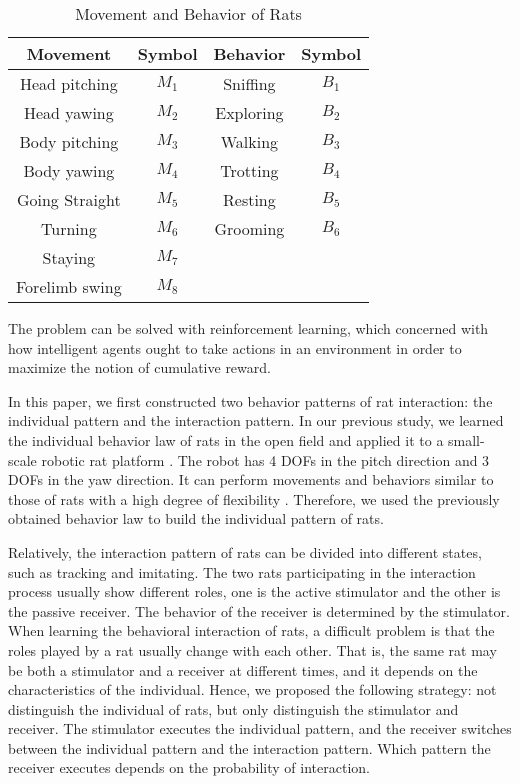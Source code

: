 \begin{table}[b]
    \caption{Movement and Behavior of Rats}
    \centering
    \begin{tabular}{cccc}
            \hline
            Movement & Symbol & Behavior & Symbol \\
            \hline
            Head pitching & $M_1$ & Sniffing & $B_1$ \\
            Head yawing & $M_2$ & Exploring & $B_2$ \\
            Body pitching & $M_3$ & Walking & $B_3$ \\
            Body yawing & $M_4$ & Trotting & $B_4$ \\
            Going Straight & $M_5$ & Resting & $B_5$ \\
            Turning & $M_6$ & Grooming & $B_6$ \\
            Staying & $M_7$ & & \\
            Forelimb swing & $M_8$ & & \\
            \hline
            \end{tabular}
    \label{table:movement and behavior of rats}
\end{table}

The problem can be solved with reinforcement learning, which concerned with how
intelligent agents ought to take actions in an environment in order to maximize
the notion of cumulative reward.

In this paper, we first constructed two behavior patterns of rat interaction:
the individual pattern and the interaction pattern. In our previous study, we
learned the individual behavior law of rats in the open field and applied it to
a small-scale robotic rat platform \cite{gao-eng-2022}. The robot has 4 DOFs in
the pitch direction and 3 DOFs in the yaw direction. It can perform movements
and behaviors similar to those of rats with a high degree of flexibility
\cite{shi-gao-tro-2021}. Therefore, we used the previously obtained behavior law
to build the individual pattern of rats.

Relatively, the interaction pattern of rats can be divided into different states,
such as tracking and imitating. The two rats participating in the interaction
process usually show different roles, one is the active stimulator and the other
is the passive receiver. The behavior of the receiver is determined by the
stimulator. When learning the behavioral interaction of rats, a difficult
problem is that the roles played by a rat usually change with each other. That
is, the same rat may be both a stimulator and a receiver at different times, and
it depends on the characteristics of the individual. Hence, we proposed the
following strategy: not distinguish the individual of rats, but only distinguish
the stimulator and receiver. The stimulator executes the individual pattern, and
the receiver switches between the individual pattern and the interaction
pattern. Which pattern the receiver executes depends on the probability of
interaction.

